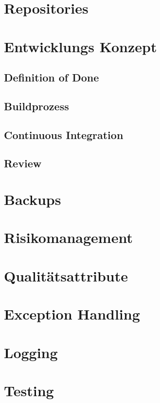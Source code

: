 \section{Repositories} \label{repositories}

\section{Entwicklungs Konzept}

\subsection{Definition of Done} \label{dod} 

\subsection{Buildprozess} \label{buildprocess}

\subsection{Continuous Integration}

\subsection{Review} \label{review}

\section{Backups} \label{backup}

\section{Risikomanagement} \label{tbl:risktable}

\begin{landscape}
\end{landscape}

\section{Qualitätsattribute} \label{quality-attributes}

\section{Exception Handling}

\section{Logging} \label{logging}

\section{Testing}